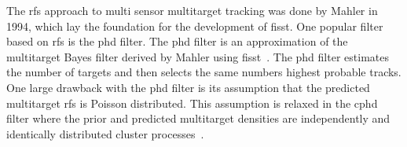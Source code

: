 The \gls{rfs} approach to multi sensor multitarget tracking was done by Mahler in 1994, which lay the foundation for the development of \gls{fisst}. One popular filter based on \gls{rfs} is the \gls{phd} filter. The \gls{phd} filter is an approximation of the multitarget Bayes filter derived by Mahler using \gls{fisst}~\cite{Vo2015}. The \gls{phd} filter estimates the number of targets and then selects the same numbers highest probable tracks. One large drawback with the \gls{phd} filter is its assumption that the predicted multitarget \gls{rfs} is Poisson distributed. This assumption is relaxed in the \gls{cphd} filter where the prior and predicted multitarget densities are independently and identically distributed cluster processes~\cite{Mahler2007}.

